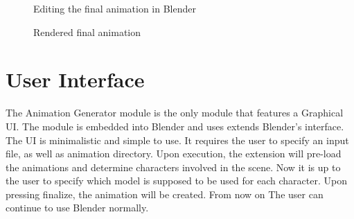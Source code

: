 \begin{figure}[!ht]
\centerline{}
\caption{Editing the final animation in Blender}\label{fig:finalblend}
\end{figure}
\begin{figure}[!ht]
\centerline{}
\caption{Rendered final animation}\label{fig:finalrend}
\end{figure}

\section{User Interface}

The Animation Generator module is the only module that features a Graphical UI. The module is embedded into Blender and uses extends Blender's interface. The UI is minimalistic and simple to use. It requires the user to specify an input file, as well as animation directory. Upon execution, the extension will pre-load the animations and determine characters involved in the scene. Now it is up to the user to specify which model is supposed to be used for each character. Upon pressing finalize, the animation will be created. From now on The user can continue to use Blender normally.


